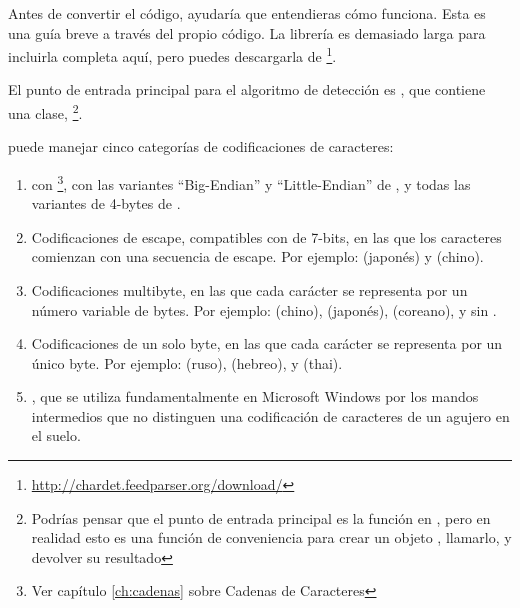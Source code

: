 Antes de convertir el código, ayudaría que entendieras cómo funciona. Esta es una guía breve a través del propio código. La librería  es demasiado larga para incluirla completa aquí, pero puedes descargarla de \footnote{\href{http://chardet.feedparser.org/download/}{http://chardet.feedparser.org/download/}}.


El punto de entrada principal para el algoritmo de detección es , que contiene una clase,  \footnote{Podrías pensar que el punto de entrada principal es la función  en , pero en realidad esto es una función de conveniencia para crear un objeto  , llamarlo, y devolver su resultado}.

 puede manejar cinco categorías de codificaciones de caracteres:

\begin{enumerate}
  \item {} con \footnote{Ver capítulo \ref{ch:cadenas} sobre Cadenas de Caracteres}, con las variantes ``Big-Endian'' y ``Little-Endian'' de , y todas las variantes de 4-bytes de .

  \item Codificaciones de escape, compatibles con  de 7-bits, 
    en las que los caracteres  comienzan con una secuencia de escape. Por ejemplo:  (japonés) y (chino).

  \item Codificaciones multibyte, en las que cada carácter se representa por un número variable de bytes. Por ejemplo:  (chino),  (japonés),  (coreano), y  sin .

  \item Codificaciones de un solo byte, en las que cada carácter se representa por un único byte. Por ejemplo:  (ruso),  (hebreo), y  (thai).

  \item {}, que se utiliza fundamentalmente en Microsoft Windows por los mandos intermedios que no distinguen una codificación de caracteres de un agujero en el suelo.

\end{enumerate}

